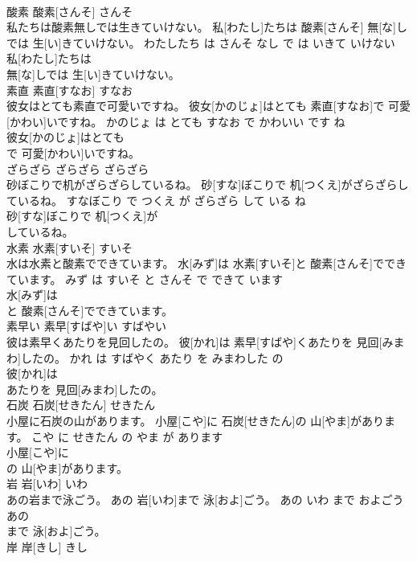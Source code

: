 \documentclass[8pt]{extreport}
\begin{document}
\begin{CJK}{UTF8}{min}
\\	酸素	酸素[さんそ]	さんそ	
\\	私たちは酸素無しでは生きていけない。	私[わたし]たちは 酸素[さんそ] 無[な]しでは 生[い]きていけない。	わたしたち は さんそ なし で は いきて いけない	
\\	私[わたし]たちは
\\	無[な]しでは 生[い]きていけない。			
\\	素直	素直[すなお]	すなお	
\\	彼女はとても素直で可愛いですね。	彼女[かのじょ]はとても 素直[すなお]で 可愛[かわい]いですね。	かのじょ は とても すなお で かわいい です ね	
\\	彼女[かのじょ]はとても
\\	で 可愛[かわい]いですね。			
\\	ざらざら	ざらざら	ざらざら	
\\	砂ぼこりで机がざらざらしているね。	砂[すな]ぼこりで 机[つくえ]がざらざらしているね。	すなぼこり で つくえ が ざらざら して いる ね	
\\	砂[すな]ぼこりで 机[つくえ]が
\\	しているね。			
\\	水素	水素[すいそ]	すいそ	
\\	水は水素と酸素でできています。	水[みず]は 水素[すいそ]と 酸素[さんそ]でできています。	みず は すいそ と さんそ で できて います	
\\	水[みず]は
\\	と 酸素[さんそ]でできています。			
\\	素早い	素早[すばや]い	すばやい	
\\	彼は素早くあたりを見回したの。	彼[かれ]は 素早[すばや]くあたりを 見回[みまわ]したの。	かれ は すばやく あたり を みまわした の	
\\	彼[かれ]は
\\	あたりを 見回[みまわ]したの。			
\\	石炭	石炭[せきたん]	せきたん	
\\	小屋に石炭の山があります。	小屋[こや]に 石炭[せきたん]の 山[やま]があります。	こや に せきたん の やま が あります	
\\	小屋[こや]に
\\	の 山[やま]があります。			
\\	岩	岩[いわ]	いわ	
\\	あの岩まで泳ごう。	あの 岩[いわ]まで 泳[およ]ごう。	あの いわ まで およごう	
\\	あの
\\	まで 泳[およ]ごう。			
\\	岸	岸[きし]	きし	

\end{CJK}
\end{document}
